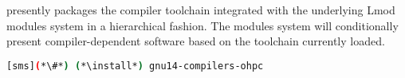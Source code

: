 \OHPC{} presently packages the \GNU{} compiler toolchain integrated with the
underlying Lmod modules system in a hierarchical fashion. The modules
system will conditionally present compiler-dependent software based on the
toolchain currently loaded.

\begin{lstlisting}[language=bash]
[sms](*\#*) (*\install*) gnu14-compilers-ohpc
\end{lstlisting}

